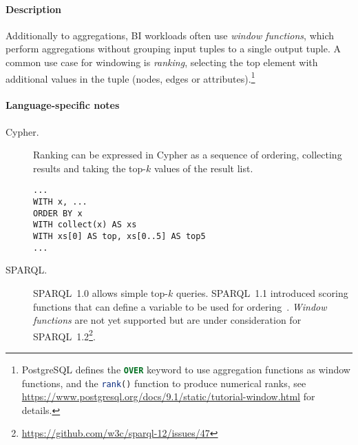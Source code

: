 



\paragraph{Description}

Additionally to aggregations, BI workloads often use \emph{window functions},
which perform aggregations without grouping input tuples to a single output
tuple.  A common use case for windowing is \emph{ranking}, \ie selecting the top
element with additional values in the tuple (nodes, edges or
attributes).\footnote{PostgreSQL defines the \lstinline[language=sql]{OVER}
keyword to use aggregation functions as window functions, and the
\lstinline[language=sql]{rank()} function to produce numerical ranks, see
\url{https://www.postgresql.org/docs/9.1/static/tutorial-window.html} for
details.}

\paragraph{Language-specific notes}

\begin{description}
\item[Cypher.]
Ranking can be expressed in Cypher as a sequence of ordering, collecting results and taking the top-$k$ values of the result list.\\

\noindent\begin{minipage}{\linewidth}
\begin{lstlisting}[language=cypher]
...
WITH x, ...
ORDER BY x
WITH collect(x) AS xs
WITH xs[0] AS top, xs[0..5] AS top5
...
\end{lstlisting}
\end{minipage}

\item[SPARQL.] SPARQL~1.0 allows simple top-$k$ queries. SPARQL~1.1 introduced scoring functions that can define a variable to be used for ordering~\cite{DBLP:conf/semweb/MagliacaneBV12}.
\emph{Window functions} are not yet supported but are under consideration for SPARQL~1.2\footnote{\url{https://github.com/w3c/sparql-12/issues/47}}.

\end{description}

